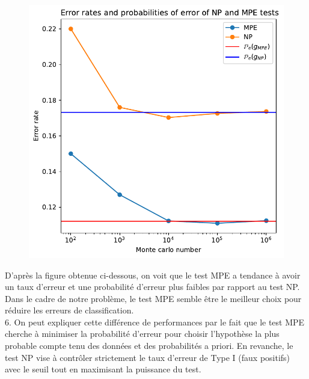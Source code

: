\documentclass[12pt,a4paper]{article}
\begin{document}
\begin{figure}[h!]
	\centering
	\includegraphics{Error_rate.pdf}
\end{figure}

D'après la figure obtenue ci-dessous, on voit que le test MPE a tendance à avoir un taux d'erreur et une probabilité d'erreur plus faibles par rapport au test NP. Dans le cadre de notre problème, le test MPE semble être le meilleur choix pour réduire les erreurs de classification.\\

6. On peut expliquer cette différence de performances par le fait que le test MPE cherche à minimiser la probabilité d'erreur pour choisir l'hypothèse la plus probable compte tenu des données et des probabilités a priori. En revanche, le test NP vise à contrôler strictement le taux d'erreur de Type I (faux positifs) avec le seuil tout en maximisant la puissance du test.
\end{document}
